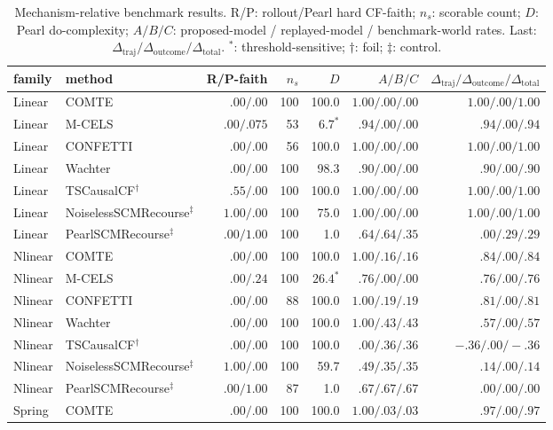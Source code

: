 \documentclass{article}
\newcommand{\dototal}{\Delta_{\mathrm{total}}}
\newcommand{\dotraj}{\Delta_{\mathrm{traj}}}
\newcommand{\dooutcome}{\Delta_{\mathrm{outcome}}}
\begin{document}
\begin{table}[t]
  \centering
  \scriptsize
  \caption{Mechanism-relative benchmark results.  R/P: rollout/Pearl hard CF-faith; $n_s$: scorable count; $D$: Pearl do-complexity; $A/B/C$: proposed-model / replayed-model / benchmark-world rates.  Last: $\dotraj/\dooutcome/\dototal$. $^*$: threshold-sensitive; $\dagger$: foil; $\ddagger$: control.}
  \label{tab:mechanism-benchmark-results}
  \setlength{\tabcolsep}{2.5pt}
  \begin{tabular}{@{}llrrrrr@{}}
    \toprule
    family & method & R/P-faith & $n_s$ & $D$ & $A/B/C$ & $\dotraj/\dooutcome/\dototal$ \\
    \midrule
    Linear & COMTE    & $.00/.00$ & 100 & 100.0 & $1.00/.00/.00$ & $1.00/.00/1.00$ \\
    Linear & M-CELS   & $.00/.075$ &  53 & $6.7^{*}$ & $.94/.00/.00$ & $.94/.00/.94$ \\
    Linear & CONFETTI & $.00/.00$ &  56 & 100.0 & $1.00/.00/.00$ & $1.00/.00/1.00$ \\
    Linear & Wachter  & $.00/.00$ & 100 & 98.3 & $.90/.00/.00$ & $.90/.00/.90$ \\
    Linear & TSCausalCF$^{\dagger}$ & $.55/.00$ & 100 & 100.0 & $1.00/.00/.00$ & $1.00/.00/1.00$ \\
    Linear & NoiselessSCMRecourse$^{\ddagger}$ & $1.00/.00$ & 100 & 75.0 & $1.00/.00/.00$ & $1.00/.00/1.00$ \\
    Linear & PearlSCMRecourse$^{\ddagger}$ & $.00/1.00$ & 100 & 1.0 & $.64/.64/.35$ & $.00/.29/.29$ \\
    \midrule
    Nlinear & COMTE    & $.00/.00$ & 100 & 100.0 & $1.00/.16/.16$ & $.84/.00/.84$ \\
    Nlinear & M-CELS   & $.00/.24$ & 100 & $26.4^{*}$ & $.76/.00/.00$ & $.76/.00/.76$ \\
    Nlinear & CONFETTI & $.00/.00$ &  88 & 100.0 & $1.00/.19/.19$ & $.81/.00/.81$ \\
    Nlinear & Wachter  & $.00/.00$ & 100 & 100.0 & $1.00/.43/.43$ & $.57/.00/.57$ \\
    Nlinear & TSCausalCF$^{\dagger}$ & $.00/.00$ & 100 & 100.0 & $.00/.36/.36$ & $-.36/.00/-.36$ \\
    Nlinear & NoiselessSCMRecourse$^{\ddagger}$ & $1.00/.00$ & 100 & 59.7 & $.49/.35/.35$ & $.14/.00/.14$ \\
    Nlinear & PearlSCMRecourse$^{\ddagger}$ & $.00/1.00$ & 87 & 1.0 & $.67/.67/.67$ & $.00/.00/.00$ \\
    \midrule
    Spring & COMTE    & $.00/.00$ & 100 & 100.0 & $1.00/.03/.03$ & $.97/.00/.97$ \\

\end{tabular}
\end{table}
\end{document}
